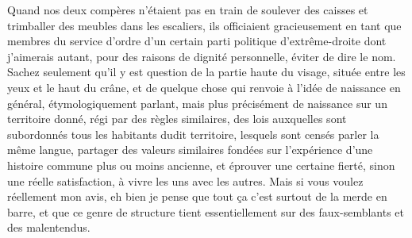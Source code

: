 Quand nos deux compères n’étaient pas en train de soulever des caisses et trimballer des meubles dans les escaliers, ils officiaient gracieusement en tant que membres du service d’ordre d’un certain parti politique d’extrême-droite dont j’aimerais autant, pour des raisons de dignité personnelle, éviter de dire le nom. Sachez seulement qu’il y est question de la partie haute du visage, située entre les yeux et le haut du crâne, et de quelque chose qui renvoie à l’idée de naissance en général, étymologiquement parlant, mais plus précisément de naissance sur un territoire donné, régi par des règles similaires, des lois auxquelles sont subordonnés tous les habitants dudit territoire, lesquels sont censés parler la même langue, partager des valeurs similaires fondées sur l’expérience d’une histoire commune plus ou moins ancienne, et éprouver une certaine fierté, sinon une réelle satisfaction, à vivre les uns avec les autres. Mais si vous voulez réellement mon avis, eh bien je pense que tout ça c’est surtout de la merde en barre, et que ce genre de structure tient essentiellement sur des faux-semblants et des malentendus.

